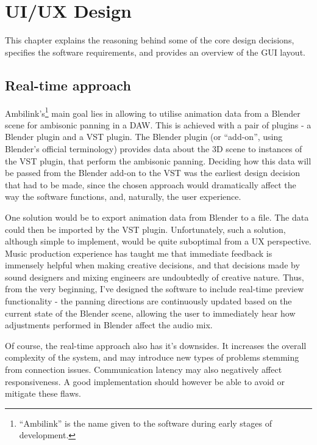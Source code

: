 \chapter{UI/UX Design}\label{chapter:ui_ux_design_reqs}

\begin{chapterabstract}
    This chapter explains the reasoning behind some of the core design decisions, 
    specifies the software requirements, 
    and provides an overview of the GUI layout.
\end{chapterabstract}

\section{Real-time approach}
Ambilink's\footnote{``Ambilink'' is the name given to the software during early stages of development.} main goal lies in allowing to utilise animation data 
from a Blender scene for ambisonic panning in a DAW. This is achieved with a pair of plugins - a Blender plugin and a VST plugin.
The Blender plugin (or ``add-on'', using Blender's official terminology) 
provides data about the 3D scene to instances of the VST plugin, that perform the ambisonic panning.
Deciding how this data will be passed from the Blender add-on to the VST was the earliest design decision that had to be made, 
since the chosen approach would dramatically affect the way the software functions, and, naturally, the user experience. 

One solution would be to export animation data from Blender to a file.
The data could then be imported by the VST plugin.
Unfortunately, such a solution, although simple to implement, would be quite suboptimal from a UX perspective.
Music production experience has taught me that immediate feedback is immensely helpful when making creative decisions, 
and that decisions made by sound designers and mixing engineers are undoubtedly of creative nature.
Thus, from the very beginning, I've designed the software to include real-time preview functionality - 
the panning directions are continuously updated based on the current state of the Blender scene, 
allowing the user to immediately hear how adjustments performed in Blender affect the audio mix.

Of course, the real-time approach also has it's downsides. It increases the overall complexity of the system,
and may introduce new types of problems stemming from connection issues. 
Communication latency may also negatively affect responsiveness.
A good implementation should however be able to avoid or mitigate these flaws.

